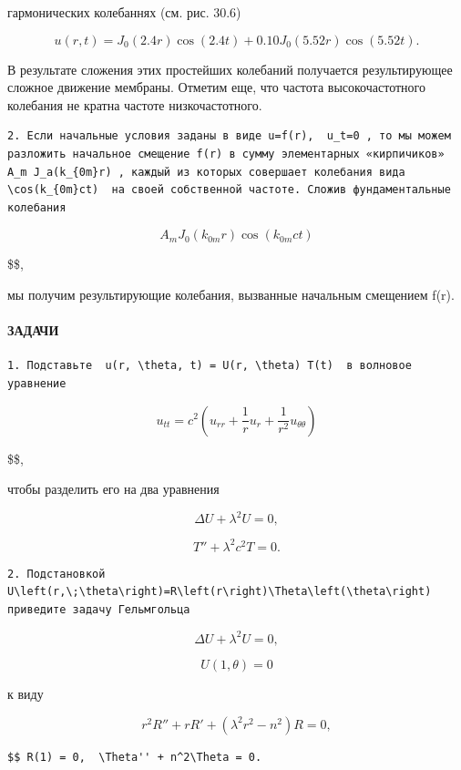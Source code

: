 \documentclass[
  ukrainian,
]{article}
\begin{document}
гармонических колебаннях (см. рис. 30.6)

\[
u(r, t) = J_0(2.4 r) \cos(2.4 t) + 0.10 J_0(5.52 r) \cos(5.52 t).
\]

В результате сложения этих простейших колебаний получается
результирующее сложное движение мембраны. Отметим еще, что частота
высокочастотного колебания не кратна частоте низкочастотного.

\begin{verbatim}
2. Если начальные условия заданы в виде u=f(r),  u_t=0 , то мы можем разложить начальное смещение f(r) в сумму элементарных «кирпичиков»  A_m J_a(k_{0m}r) , каждый из которых совершает колебания вида  \cos(k_{0m}ct)  на своей собственной частоте. Сложив фундаментальные колебания
\end{verbatim}

\[
A_m J_0(k_{0m}r)\cos(k_{0m}ct)
\]

\$\$,

мы получим результирующие колебания, вызванные начальным смещением f(r).

\paragraph{ЗАДАЧИ}\label{ux437ux430ux434ux430ux447ux438-6}

\begin{verbatim}
1. Подставьте  u(r, \theta, t) = U(r, \theta) T(t)  в волновое уравнение
\end{verbatim}

\[
u_{tt} = c^2 \left( u_{rr} + \frac{1}{r} u_r + \frac{1}{r^2} u_{\theta\theta} \right)
\]

\$\$,

чтобы разделить его на два уравнения

\[
\Delta U + \lambda^2 U = 0,
\]

\[
T'' + \lambda^2 c^2 T = 0.
\]

\begin{verbatim}
2. Подстановкой  U\left(r,\;\theta\right)=R\left(r\right)\Theta\left(\theta\right)  приведите задачу Гельмгольца
\end{verbatim}

\[
\Delta U + \lambda^2 U = 0,
\]

\[
U(1, \theta) = 0
\]

к виду

\[
r^2R'' + rR' + (\lambda^2r^2 - n^2)R = 0,
\]

\begin{verbatim}
$$ R(1) = 0,  \Theta'' + n^2\Theta = 0.
\end{verbatim}
\end{document}
